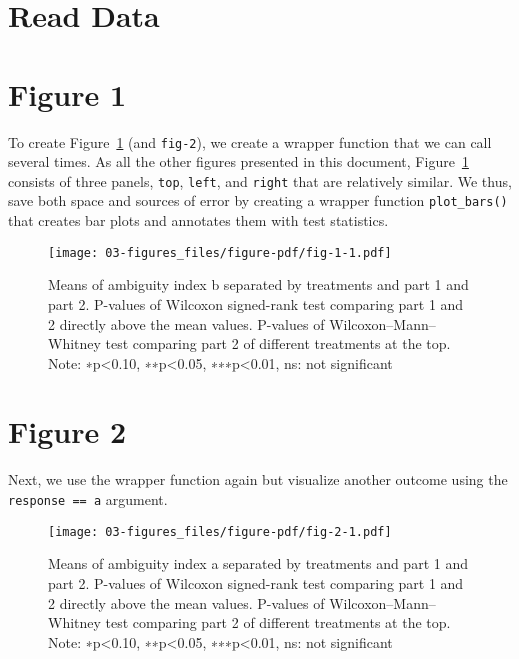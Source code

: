 \documentclass[
  a4paper,
  DIV=11,
  numbers=noendperiod]{scrreprt}
\begin{document}
\hypertarget{read-data-2}{%
\section{Read Data}\label{read-data-2}}

\hypertarget{figure-1}{%
\section{Figure 1}\label{figure-1}}

To create Figure~\ref{fig-1} (and \texttt{fig-2}), we create a wrapper
function that we can call several times. As all the other figures
presented in this document, Figure~\ref{fig-1} consists of three panels,
\texttt{top}, \texttt{left}, and \texttt{right} that are relatively
similar. We thus, save both space and sources of error by creating a
wrapper function \texttt{plot\_bars()} that creates bar plots and
annotates them with test statistics.

\begin{figure}

{\centering \texttt{[image: 03-figures\_files/figure-pdf/fig-1-1.pdf]}

}

\caption{\label{fig-1}Means of ambiguity index b separated by treatments
and part 1 and part 2. P-values of Wilcoxon signed-rank test comparing
part 1 and 2 directly above the mean values. P-values of
Wilcoxon--Mann--Whitney test comparing part 2 of different treatments at
the top. Note: ∗p\textless0.10, ∗∗p\textless0.05, ∗∗∗p\textless0.01, ns:
not significant}

\end{figure}

\hypertarget{figure-2}{%
\section{Figure 2}\label{figure-2}}

Next, we use the wrapper function again but visualize another outcome
using the \texttt{response\ ==\ a} argument.

\begin{figure}

{\centering \texttt{[image: 03-figures\_files/figure-pdf/fig-2-1.pdf]}

}

\caption{\label{fig-2}Means of ambiguity index a separated by treatments
and part 1 and part 2. P-values of Wilcoxon signed-rank test comparing
part 1 and 2 directly above the mean values. P-values of
Wilcoxon--Mann--Whitney test comparing part 2 of different treatments at
the top. Note: ∗p\textless0.10, ∗∗p\textless0.05, ∗∗∗p\textless0.01, ns:
not significant}

\end{figure}
\end{document}
